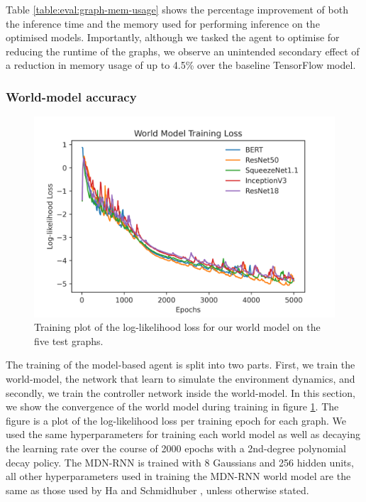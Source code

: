 Table \ref{table:eval:graph-mem-usage} shows the percentage improvement of both the inference time and the memory used for performing inference on the optimised models. Importantly, although we tasked the agent to optimise for reducing the runtime of the graphs, we observe an unintended secondary effect of a reduction in memory usage of up to 4.5\% over the baseline TensorFlow model.

\subsubsection{World-model accuracy}
\label{sec:eval:subsubsec:wm-acc}

\begin{figure}[h]
  \centering
  \includegraphics[width=1\columnwidth]{sections/5evaluation/images/mb_training_loss}
  \caption[Log-likelihood loss of world models]{Training plot of the log-likelihood loss for our world model on the five test graphs.}
  \label{fig:eval:world-model-loss}
\end{figure}

The training of the model-based agent is split into two parts. First, we train the world-model, the network that learn to simulate the environment dynamics, and secondly, we train the controller network inside the world-model. In this section, we show the convergence of the world model during training in figure \ref{fig:eval:world-model-loss}. The figure is a plot of the log-likelihood loss per training epoch for each graph. We used the same hyperparameters for training each world model as well as decaying the learning rate over the course of 2000 epochs with a 2nd-degree polynomial decay policy. The MDN-RNN is trained with 8 Gaussians and 256 hidden units, all other hyperparameters used in training the MDN-RNN world model are the same as those used by Ha and Schmidhuber \cite{ha2018worldmodels}, unless otherwise stated.

